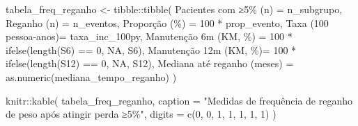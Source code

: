 \documentclass[
]{article}
\newenvironment{Shaded}{\begin{snugshade}}{\end{snugshade}}
\newcommand{\AttributeTok}[1]{\textcolor[rgb]{0.40,0.45,0.13}{#1}}
\newcommand{\ConstantTok}[1]{\textcolor[rgb]{0.56,0.35,0.01}{#1}}
\newcommand{\DecValTok}[1]{\textcolor[rgb]{0.68,0.00,0.00}{#1}}
\newcommand{\FunctionTok}[1]{\textcolor[rgb]{0.28,0.35,0.67}{#1}}
\newcommand{\NormalTok}[1]{\textcolor[rgb]{0.00,0.23,0.31}{#1}}
\newcommand{\OtherTok}[1]{\textcolor[rgb]{0.00,0.23,0.31}{#1}}
\newcommand{\SpecialCharTok}[1]{\textcolor[rgb]{0.37,0.37,0.37}{#1}}
\newcommand{\StringTok}[1]{\textcolor[rgb]{0.13,0.47,0.30}{#1}}
\begin{document}
\begin{Shaded}
\begin{Highlighting}[]
\NormalTok{tabela\_freq\_reganho }\OtherTok{\textless{}{-}}\NormalTok{ tibble}\SpecialCharTok{::}\FunctionTok{tibble}\NormalTok{(}
  \StringTok{\textasciigrave{}}\AttributeTok{Pacientes com ≥5\% (n)}\StringTok{\textasciigrave{}} \OtherTok{=}\NormalTok{ n\_subgrupo,}
  \StringTok{\textasciigrave{}}\AttributeTok{Reganho (n)}\StringTok{\textasciigrave{}}           \OtherTok{=}\NormalTok{ n\_eventos,}
  \StringTok{\textasciigrave{}}\AttributeTok{Proporção (\%)}\StringTok{\textasciigrave{}}         \OtherTok{=} \DecValTok{100} \SpecialCharTok{*}\NormalTok{ prop\_evento,}
  \StringTok{\textasciigrave{}}\AttributeTok{Taxa (100 pessoa{-}anos)}\StringTok{\textasciigrave{}}\OtherTok{=}\NormalTok{ taxa\_inc\_100py,}
  \StringTok{\textasciigrave{}}\AttributeTok{Manutenção 6m (KM, \%)}\StringTok{\textasciigrave{}} \OtherTok{=} \DecValTok{100} \SpecialCharTok{*} \FunctionTok{ifelse}\NormalTok{(}\FunctionTok{length}\NormalTok{(S6) }\SpecialCharTok{==} \DecValTok{0}\NormalTok{, }\ConstantTok{NA}\NormalTok{, S6),}
  \StringTok{\textasciigrave{}}\AttributeTok{Manutenção 12m (KM, \%)}\StringTok{\textasciigrave{}}\OtherTok{=} \DecValTok{100} \SpecialCharTok{*} \FunctionTok{ifelse}\NormalTok{(}\FunctionTok{length}\NormalTok{(S12) }\SpecialCharTok{==} \DecValTok{0}\NormalTok{, }\ConstantTok{NA}\NormalTok{, S12),}
  \StringTok{\textasciigrave{}}\AttributeTok{Mediana até reganho (meses)}\StringTok{\textasciigrave{}} \OtherTok{=} \FunctionTok{as.numeric}\NormalTok{(mediana\_tempo\_reganho)}
\NormalTok{)}

\NormalTok{knitr}\SpecialCharTok{::}\FunctionTok{kable}\NormalTok{(}
\NormalTok{  tabela\_freq\_reganho,}
  \AttributeTok{caption =} \StringTok{"Medidas de frequência de reganho de peso após atingir perda ≥5\%"}\NormalTok{,}
  \AttributeTok{digits =} \FunctionTok{c}\NormalTok{(}\DecValTok{0}\NormalTok{, }\DecValTok{0}\NormalTok{, }\DecValTok{1}\NormalTok{, }\DecValTok{1}\NormalTok{, }\DecValTok{1}\NormalTok{, }\DecValTok{1}\NormalTok{, }\DecValTok{1}\NormalTok{)}
\NormalTok{)}
\end{Highlighting}
\end{Shaded}
\end{document}
